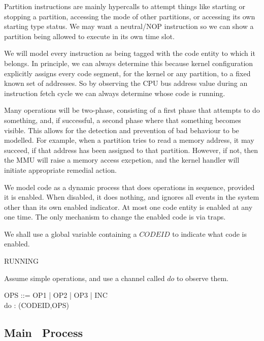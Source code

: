 Partition instructions are mainly hypercalls to attempt
things like starting or stopping a partition,
accessing the mode of other partitions,
or accessing its own starting type status.
We may want a neutral/NOP instruction so we can show a partition
being allowed to execute in its own time slot.

We will model every instruction as being tagged with the code entity to
which it belongs.
In principle, we can always determine this because kernel configuration
explicitly assigns every code segment,
for the kernel or any partition,
to a fixed known set of addresses.
So by observing the CPU bus address value during an instruction fetch cycle
we can always determine whose code is running.

Many operations will be two-phase,
consisting of a first phase that attempts to do something,
and, if successful, a second phase where that something becomes visible.
This allows for the detection and prevention of bad behaviour to be modelled.
For example, when a partition tries to read a memory address,
it may succeed, if that address has been assigned to that partition.
However, if not, then the MMU will raise a memory access excpetion,
and the kernel handler will initiate appropriate remedial action.

We model code as a dynamic process that does operations in sequence,
provided it is enabled.
When disabled, it does nothing, and ignores all events in the system
other than its own enabled indicator.
At most one code entity is enabled at any one time.
The only mechanism to change the enabled code is via
traps.

We shall use a global variable containing a $CODEID$ to indicate
what code is enabled.
\begin{circus}
RUNNING 
\end{circus}

Assume simple operations,
and use a channel called $do$ to observe them.
\begin{circus}
   OPS ::= OP1 | OP2 | OP3 | INC
\\ \circchannel do : (CODEID,OPS)
\end{circus}



\newpage
\subsection{Main \Circus\ Process}

